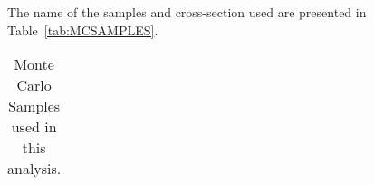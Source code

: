 {The name of the samples and cross-section used are presented in Table~\ref{tab:MCSAMPLES}.





\begin{table}[htb]
\caption{Monte Carlo Samples used in this analysis.} 
\begin{center}
\begin{tabular}{|r|l|l|l|}
\hline


\end{tabular}
\end{center}
\end{table}}

